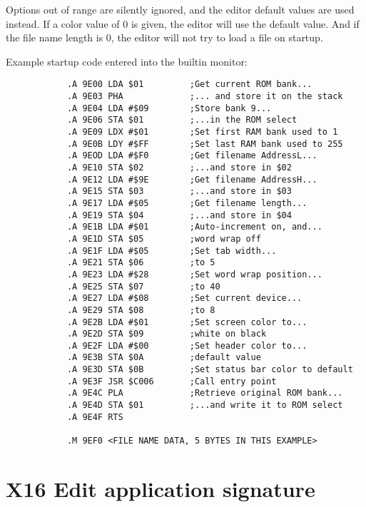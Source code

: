 \documentclass{article}
\begin{document}
        \vspace{1em}Options out of range are silently ignored, and the editor default values are used instead. If a color value of 0 is given, the
        editor will use the default value. And if the file name length is 0, the editor will not try to load a file on startup.

        Example startup code entered into the builtin monitor:

        \begin{verbatim}
            .A 9E00 LDA $01         ;Get current ROM bank...
            .A 9E03 PHA             ;... and store it on the stack
            .A 9E04 LDA #$09        ;Store bank 9...
            .A 9E06 STA $01         ;...in the ROM select
            .A 9E09 LDX #$01        ;Set first RAM bank used to 1
            .A 9E0B LDY #$FF        ;Set last RAM bank used to 255
            .A 9EOD LDA #$F0        ;Get filename AddressL...
            .A 9E10 STA $02         ;...and store in $02
            .A 9E12 LDA #$9E        ;Get filename AddressH...
            .A 9E15 STA $03         ;...and store in $03
            .A 9E17 LDA #$05        ;Get filename length...
            .A 9E19 STA $04         ;...and store in $04
            .A 9E1B LDA #$01        ;Auto-increment on, and...
            .A 9E1D STA $05         ;word wrap off
            .A 9E1F LDA #$05        ;Set tab width...
            .A 9E21 STA $06         ;to 5
            .A 9E23 LDA #$28        ;Set word wrap position...
            .A 9E25 STA $07         ;to 40
            .A 9E27 LDA #$08        ;Set current device...
            .A 9E29 STA $08         ;to 8
            .A 9E2B LDA #$01        ;Set screen color to...
            .A 9E2D STA $09         ;white on black
            .A 9E2F LDA #$00        ;Set header color to...
            .A 9E3B STA $0A         ;default value
            .A 9E3D STA $0B         ;Set status bar color to default
            .A 9E3F JSR $C006       ;Call entry point
            .A 9E4C PLA             ;Retrieve original ROM bank...
            .A 9E4D STA $01         ;...and write it to ROM select
            .A 9E4F RTS

            .M 9EF0 <FILE NAME DATA, 5 BYTES IN THIS EXAMPLE>
        \end{verbatim} 

\section{X16 Edit application signature}
    
\end{document}
